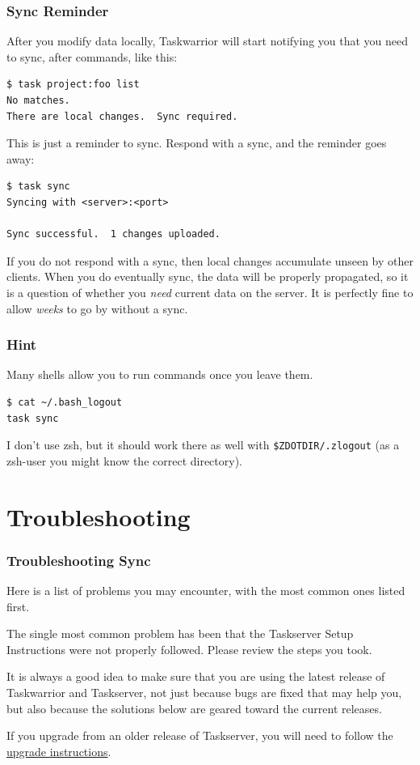 \documentclass[t,handout]{beamer}
\begin{document}
\begin{frame}[fragile]\frametitle{Sync Reminder}
    After you modify data locally, Taskwarrior will start notifying you that you need to sync, after commands, like this:

    \begin{lstlisting}
$ task project:foo list
No matches.
There are local changes.  Sync required.\end{lstlisting}

    This is just a reminder to sync. Respond with a sync, and the reminder goes away:

    \begin{lstlisting}
$ task sync
Syncing with <server>:<port>

Sync successful.  1 changes uploaded.\end{lstlisting}

    If you do not respond with a sync, then local changes accumulate unseen by other clients. When you do eventually sync, the data will be properly propagated, so it is a question of whether you \emph{need} current data on the server. It is perfectly fine to allow \emph{weeks} to go by without a sync.
\end{frame}

\begin{frame}[fragile]\frametitle{Hint}
    \vfill
    Many shells allow you to run commands once you leave them.

    \begin{lstlisting}
$ cat ~/.bash_logout
task sync\end{lstlisting}

    I don't use zsh, but it should work there as well with \verb+$ZDOTDIR/.zlogout+ (as a zsh-user you might know the correct directory).
\end{frame}

\section{Troubleshooting}

\begin{frame}[fragile]\frametitle{Troubleshooting Sync}
    \vfill
    Here is a list of problems you may encounter, with the most common ones listed first.

    The single most common problem has been that the Taskserver Setup Instructions were not properly followed.  Please review the steps you took.

    It is always a good idea to make sure that you are using the latest release of Taskwarrior and Taskserver, not just because bugs are fixed that may help you, but also because the solutions below are geared toward the current releases.

    If you upgrade from an older release of Taskserver, you will need to follow the \href{http://taskwarrior.org/docs/taskserver/upgrade.html}{upgrade instructions}.
\end{frame}
\end{document}
